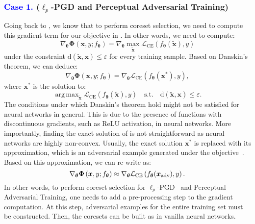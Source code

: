 \documentclass[runningheads]{llncs}
\DeclareMathOperator*{\argmax}{arg\,max}
\begin{document}
\subsubsection{\textcolor{blue}{Case 1.} ($\ell_p$-PGD and Perceptual Adversarial Training)}
Going back to , we know that to perform coreset selection, we need to compute this gradient term for our objective in .
In other words, we need to compute:
\begin{equation}\label{eq:nn_gradient_at}
\nabla_{\boldsymbol{\theta}}\boldsymbol{\Phi} \left(\boldsymbol{x}, y; f_{\boldsymbol{\theta}}\right) =  \nabla_{\boldsymbol{\theta}} \max_{\tilde{\boldsymbol{x}}} \mathcal{L}_{\mathrm{CE}}\left(f_{\boldsymbol{\theta}}(\tilde{\boldsymbol{x}}), y\right)
\end{equation}
under the constraint $\mathrm{d}\left({\tilde{\boldsymbol{x}}, \boldsymbol{x}}\right)\leq \varepsilon$ for every training sample.
Based on Danskin's theorem, we can deduce:
\begin{equation}\label{eq:nn_gradient_at_penufinal}
    \nabla_{\boldsymbol{\theta}}\boldsymbol{\Phi} \left(\boldsymbol{x}, y; f_{\boldsymbol{\theta}}\right) =  \nabla_{\boldsymbol{\theta}} \mathcal{L}_{\mathrm{CE}}\left(f_{\boldsymbol{\theta}}({\boldsymbol{x}^{*}}), y\right),
\end{equation}
where $\boldsymbol{x}^{*}$ is the solution to:
\begin{equation}\label{eq:at_max_objective}
    \argmax_{\tilde{\boldsymbol{x}}} \mathcal{L}_{\mathrm{CE}}\left(f_{\boldsymbol{\theta}}(\tilde{\boldsymbol{x}}), y\right) \quad \text{s.t.} \quad \mathrm{d}\left({\tilde{\boldsymbol{x}}, \boldsymbol{x}}\right)\leq \varepsilon.
\end{equation}
The conditions under which Danskin's theorem hold might not be satisfied for neural networks in general.
This is due to the presence of functions with discontinuous gradients, such as ReLU activation, in neural networks.
More importantly, finding the exact solution of  is not straightforward as neural networks are highly non-convex.
Usually, the exact solution $\boldsymbol{x}^{*}$ is replaced with its approximation, which is an adversarial example generated under the  objective~\cite{madry2018adversarial}.
Based on this approximation, we can re-write  as:
\begin{equation}\label{eq:nn_gradient_at_final}
    \nabla_{\boldsymbol{\theta}}\boldsymbol{\Phi} \left(\boldsymbol{x}, y; f_{\boldsymbol{\theta}}\right) \approx  \nabla_{\boldsymbol{\theta}} \mathcal{L}_{\mathrm{CE}}\left(f_{\boldsymbol{\theta}}({\boldsymbol{x}_{\rm{adv}}}), y\right).
\end{equation}
In other words, to perform coreset selection for $\ell_p$-PGD~\cite{madry2018towards} and Perceptual~\cite{laidlaw2021pat} Adversarial Training, one needs to add a pre-processing step to the gradient computation.
At this step, adversarial examples for the entire training set must be constructed.
Then, the coresets can be built as in vanilla neural networks.
\end{document}
